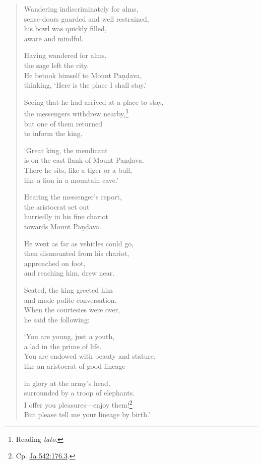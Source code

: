 \documentclass[12pt,openany]{book}%
\begin{document}
\begin{verse}
Wandering indiscriminately for alms, \\
sense-doors guarded and well restrained, \\
his bowl was quickly filled, \\
aware and mindful. 

Having wandered for alms, \\
the sage left the city. \\
He betook himself to Mount \textsanskrit{Paṇḍava}, \\
thinking, ‘Here is the place I shall stay.’ 

Seeing that he had arrived at a place to stay, \\
the messengers withdrew nearby,\footnote{Reading \textit{tato}. } \\
but one of them returned \\
to inform the king. 

‘Great king, the mendicant \\
is on the east flank of Mount \textsanskrit{Paṇḍava}. \\
There he sits, like a tiger or a bull, \\
like a lion in a mountain cave.’ 

Hearing the messenger’s report, \\
the aristocrat set out \\
hurriedly in his fine chariot \\
towards Mount \textsanskrit{Paṇḍava}. 

He went as far as vehicles could go, \\
then dismounted from his chariot, \\
approached on foot, \\
and reaching him, drew near. 

Seated, the king greeted him \\
and made polite conversation. \\
When the courtesies were over, \\
he said the following: 

‘You are young, just a youth, \\
a lad in the prime of life. \\
You are endowed with beauty and stature, \\
like an aristocrat of good lineage 

in glory at the army’s head, \\
surrounded by a troop of elephants. \\
I offer you pleasures—enjoy them!\footnote{Cp. \href{https://suttacentral.net/ja542/en/sujato\#176.3}{Ja 542:176.3}. } \\
But please tell me your lineage by birth.’ 


\end{verse}
\end{document}
